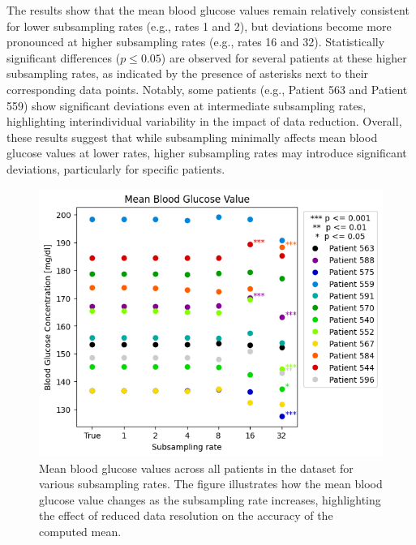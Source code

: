 The results show that the mean blood glucose values remain relatively consistent for lower subsampling rates (e.g., rates 1 and 2), but deviations become more pronounced at higher subsampling rates (e.g., rates 16 and 32). Statistically significant differences ($p \le 0.05$) are observed for several patients at these higher subsampling rates, as indicated by the presence of asterisks next to their corresponding data points. Notably, some patients (e.g., Patient 563 and Patient 559) show significant deviations even at intermediate subsampling rates, highlighting interindividual variability in the impact of data reduction.
Overall, these results suggest that while subsampling minimally affects mean blood glucose values at lower rates, higher subsampling rates may introduce significant deviations, particularly for specific patients.
\begin{figure}[h] %
	\centering
	\includegraphics[width=\linewidth]{Figures/all_patients_mean_cbg_values.png} %
	\caption{Mean blood glucose values across all patients in the dataset for various subsampling rates. The figure illustrates how the mean blood glucose value changes as the subsampling rate increases, highlighting the effect of reduced data resolution on the accuracy of the computed mean.}
	\label{fig:patients_mean}  %
\end{figure}

